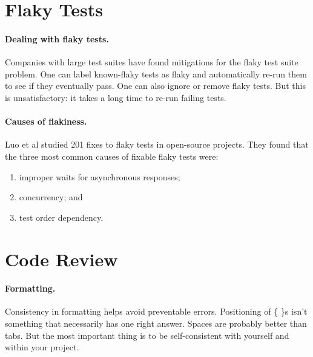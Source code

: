 \documentclass[11pt]{article}
\begin{document}
\section*{Flaky Tests}

\paragraph{Dealing with flaky tests.} Companies with large test suites have found mitigations
for the flaky test suite problem. One can label known-flaky tests as flaky and automatically
re-run them to see if they eventually pass. One can also ignore or remove flaky tests.
But this is unsatisfactory: it takes a long time to re-run failing tests.

\paragraph{Causes of flakiness.} Luo et al studied 201 fixes to flaky tests in open-source
projects. They found that the three most common causes of fixable flaky tests were:
\begin{enumerate}[noitemsep]
    \item improper waits for asynchronous responses;
    \item concurrency; and
    \item test order dependency.
\end{enumerate}

\section*{Code Review}

\paragraph{Formatting.} Consistency in formatting helps avoid preventable
errors. Positioning of \{ \}s isn't something that necessarily has one
right answer. Spaces are probably better than tabs. But the most important thing is
to be self-consistent with yourself and within your project.
\end{document}

